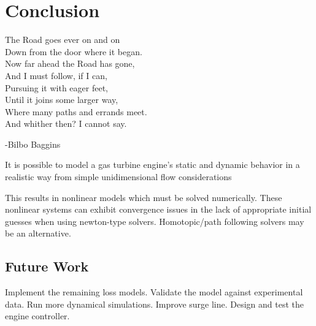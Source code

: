\documentclass[tcc]{subfiles}
\begin{document}
\chapter{Conclusion}
\label{ch:conclusion}
        \epigraph{\centering
        The Road goes ever on and on     \\
        Down from the door where it began.\\
        Now far ahead the Road has gone,\\
        And I must follow, if I can,\\
        Pursuing it with eager feet,\\
        Until it joins some larger way,\\
        Where many paths and errands meet.\\
        And whither then? I cannot say.
        }{-Bilbo Baggins}

        It is possible to model a gas turbine engine's static and dynamic behavior in a realistic way from simple unidimensional flow considerations

        This results in nonlinear models which must be solved numerically. These nonlinear systems can exhibit convergence issues in the lack of appropriate initial guesses when using newton-type solvers. Homotopic/path following solvers may be an alternative.



        \section{Future Work}
        Implement the remaining loss models. Validate the model against experimental data. Run more dynamical simulations. Improve surge line. Design and test the engine controller.
\end{document}
